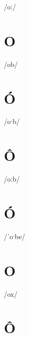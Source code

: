 \documentclass[10pt,a4paper,twoside]{book}
\begin{document}
\begin{multicols}{3}
 {/oː/} {}
\end{multicols}

\section*{O}

\begin{multicols}{3}
 {/ob/} {}
\end{multicols}

\section*{Ó}

\begin{multicols}{3}
 {/oˑb/} {}
\end{multicols}

\section*{Ô}

\begin{multicols}{3}
 {/oːb/} {}
\end{multicols}

\section*{Ó}

\begin{multicols}{3}
 {/ˈoˑbe/} {}
\end{multicols}

\section*{O}

\begin{multicols}{3}
 {/ox/} {}
\end{multicols}

\section*{Ô}
\end{document}
